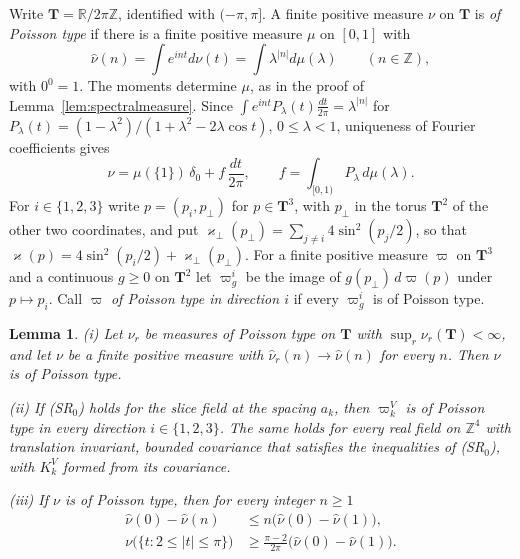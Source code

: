 \documentclass[aps,prd,twocolumn,superscriptaddress,nofootinbib,longbibliography,floatfix,amsmath,amssymb,10pt]{revtex4-2}
\newtheorem{lemma}[theorem]{Lemma}
\theoremstyle{definition}
\theoremstyle{remark}
\newcommand{\R}{\mathbb{R}}
\newcommand{\Z}{\mathbb{Z}}
\begin{document}
Write $\mathbf T=\R/2\pi\Z$, identified with $(-\pi,\pi]$. A finite positive
measure $\nu$ on $\mathbf T$ is \emph{of Poisson type} if there is a finite
positive measure $\mu$ on $[0,1]$ with
\[
\hat\nu(n)=\int e^{int}d\nu(t)=\int\lambda^{|n|}d\mu(\lambda)\qquad
(n\in\Z),
\]
with $0^0=1$. The moments determine $\mu$, as in the proof of
Lemma~\ref{lem:spectralmeasure}. Since $\int e^{int}P_\lambda(t)\frac{dt}
{2\pi}=\lambda^{|n|}$ for $P_\lambda(t)=(1-\lambda^2)/(1+\lambda^2-2\lambda
\cos t)$, $0\le\lambda<1$, uniqueness of Fourier coefficients gives
\begin{equation}\label{eq:poissonform}
\nu=\mu(\{1\})\,\delta_0+f\,\frac{dt}{2\pi},\qquad f=\int_{[0,1)}
P_\lambda\,d\mu(\lambda) .
\end{equation}
For $i\in\{1,2,3\}$ write $p=(p_i,p_\perp)$ for $p\in\mathbf T^3$, with
$p_\perp$ in the torus $\mathbf T^2$ of the other two coordinates, and put
$\varkappa_\perp(p_\perp)=\sum_{j\ne i}4\sin^2(p_j/2)$, so that
$\varkappa(p)=4\sin^2(p_i/2)+\varkappa_\perp(p_\perp)$. For a finite positive
measure $\varpi$ on $\mathbf T^3$ and a continuous $g\ge0$ on $\mathbf T^2$
let $\varpi^i_g$ be the image of $g(p_\perp)\,d\varpi(p)$ under $p\mapsto
p_i$. Call $\varpi$ \emph{of Poisson type in direction $i$} if every
$\varpi^i_g$ is of Poisson type.

\begin{lemma}\label{lem:poissontype}
\textup{(i)} Let $\nu_r$ be measures of Poisson type on $\mathbf T$ with
$\sup_r\nu_r(\mathbf T)<\infty$, and let $\nu$ be a finite positive measure
with $\hat\nu_r(n)\to\hat\nu(n)$ for every $n$. Then $\nu$ is of Poisson
type.

\textup{(ii)} If \textup{(SR$_0$)} holds for the slice field at the spacing
$a_k$, then $\varpi^V_k$ is of Poisson type in every direction
$i\in\{1,2,3\}$. The same holds for every real field on $\Z^4$ with
translation invariant, bounded covariance that satisfies the inequalities of
\textup{(SR$_0$)}, with $K^V_k$ formed from its covariance.

\textup{(iii)} If $\nu$ is of Poisson type, then for every integer $n\ge1$
\[
\begin{split}
\hat\nu(0)-\hat\nu(n)&\le n\bigl(\hat\nu(0)-\hat\nu(1)\bigr),\\
\nu\bigl(\{t:2\le|t|\le\pi\}\bigr)&\ge\frac{\pi-2}{2\pi}\bigl(\hat\nu(0)
-\hat\nu(1)\bigr) .
\end{split}
\]
\end{lemma}
\end{document}
